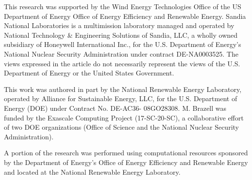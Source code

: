 \documentclass[conf]{new-aiaa}
\begin{document}
This research was supported by the Wind Energy Technologies Office of
the US Department of Energy Office of Energy Efficiency and Renewable
Energy.  Sandia National Laboratories is a multimission laboratory
managed and operated by National Technology \& Engineering Solutions
of Sandia, LLC, a wholly owned subsidiary of Honeywell International
Inc., for the U.S. Department of Energy's National Nuclear Security
Administration under contract DE-NA0003525. The views expressed in the
article do not necessarily represent the views of the U.S. Department
of Energy or the United States Government.

This work was authored in part by the National Renewable Energy
Laboratory, operated by Alliance for Sustainable Energy, LLC, for the
U.S. Department of Energy (DOE) under Contract No. DE-AC36-
08GO28308. M. Brazell was funded by the Exascale Computing
Project (17-SC-20-SC), a collaborative effort of two DOE organizations
(Office of Science and the National Nuclear Security Administration).

A portion of the research was performed using computational
resources sponsored by the Department of Energy's Office of Energy
Efficiency and Renewable Energy and located at the National Renewable
Energy Laboratory.


\end{document}
